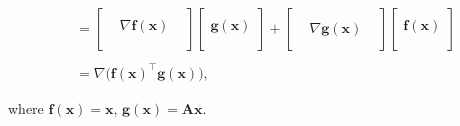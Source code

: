 \documentclass[12pt,thmsa]{article}
\begin{document}
\begin{itemize}
\[\begin{aligned}
		& \\
		& = \left[
			\begin{array}{ccc}  & &\\ &  \nabla \boldsymbol{f}(\boldsymbol{x}) & \\  & & \\  \end{array}
			\right]
		{\left[ \begin{array}{c} \\  \boldsymbol{g}(\boldsymbol{x}) \\ \\ \end{array} \right]} +
			\left[
			\begin{array}{ccc} & &\\ & \nabla \boldsymbol{g}(\boldsymbol{x}) & \\ & & \end{array}
			\right]
		{\left[ \begin{array}{c} \\ \boldsymbol{f}(\boldsymbol{x}) \\ \\ \end{array} \right]} \\
		& \\
		& = \nabla \Big(\boldsymbol{f}(\boldsymbol{x})^{\top} \boldsymbol{g}(\boldsymbol{x})\Big),
	\end{aligned} \]
	
	where \(\boldsymbol{f}(\boldsymbol{x})=\boldsymbol{x}\), \(\boldsymbol{g}(\boldsymbol{x})=\mathbf{A}\boldsymbol{x} \).
\end{itemize}
\end{document}

